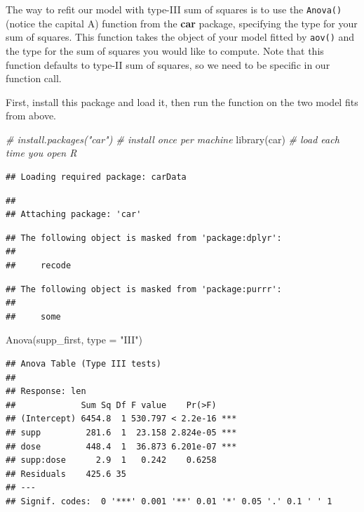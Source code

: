 \documentclass[
]{book}
\newenvironment{Shaded}{\begin{snugshade}}{\end{snugshade}}
\newcommand{\AttributeTok}[1]{\textcolor[rgb]{0.77,0.63,0.00}{#1}}
\newcommand{\CommentTok}[1]{\textcolor[rgb]{0.56,0.35,0.01}{\textit{#1}}}
\newcommand{\FunctionTok}[1]{\textcolor[rgb]{0.00,0.00,0.00}{#1}}
\newcommand{\NormalTok}[1]{#1}
\newcommand{\StringTok}[1]{\textcolor[rgb]{0.31,0.60,0.02}{#1}}
\begin{document}
The way to refit our model with type-III sum of squares is to use the \texttt{Anova()} (notice the capital A) function from the \textbf{car} package, specifying the type for your sum of squares. This function takes the object of your model fitted by \texttt{aov()} and the type for the sum of squares you would like to compute. Note that this function defaults to type-II sum of squares, so we need to be specific in our function call.

First, install this package and load it, then run the function on the two model fits from above.

\begin{Shaded}
\begin{Highlighting}[]
\CommentTok{\# install.packages("car") \# install once per machine}
\FunctionTok{library}\NormalTok{(car) }\CommentTok{\# load each time you open R}
\end{Highlighting}
\end{Shaded}

\begin{verbatim}
## Loading required package: carData
\end{verbatim}

\begin{verbatim}
## 
## Attaching package: 'car'
\end{verbatim}

\begin{verbatim}
## The following object is masked from 'package:dplyr':
## 
##     recode
\end{verbatim}

\begin{verbatim}
## The following object is masked from 'package:purrr':
## 
##     some
\end{verbatim}

\begin{Shaded}
\begin{Highlighting}[]
\FunctionTok{Anova}\NormalTok{(supp\_first, }\AttributeTok{type =} \StringTok{"III"}\NormalTok{)}
\end{Highlighting}
\end{Shaded}

\begin{verbatim}
## Anova Table (Type III tests)
## 
## Response: len
##             Sum Sq Df F value    Pr(>F)    
## (Intercept) 6454.8  1 530.797 < 2.2e-16 ***
## supp         281.6  1  23.158 2.824e-05 ***
## dose         448.4  1  36.873 6.201e-07 ***
## supp:dose      2.9  1   0.242    0.6258    
## Residuals    425.6 35                      
## ---
## Signif. codes:  0 '***' 0.001 '**' 0.01 '*' 0.05 '.' 0.1 ' ' 1
\end{verbatim}
\end{document}
